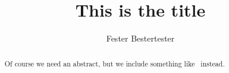 \documentclass{article}
\title{This is the title}
\author{Fester Bestertester}
\begin{document}
\maketitle
\begin{abstract}
  Of course we need an abstract, but we include something like \boguscmd\ instead.
\end{abstract}



\end{document}
